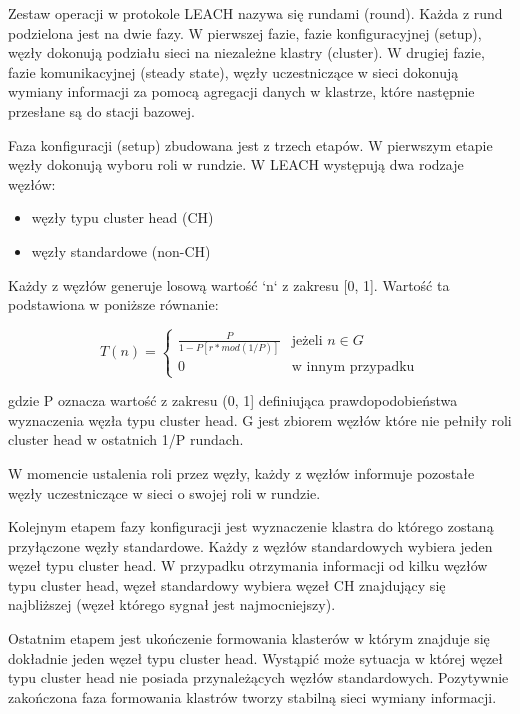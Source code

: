 \documentclass[a4paper,12pt,twoside,openany]{report}
\begin{document}
Zestaw operacji w protokole LEACH nazywa się rundami (round). Każda z rund podzielona jest na dwie fazy.
W pierwszej fazie, fazie konfiguracyjnej (setup), węzły dokonują podziału sieci na niezależne klastry (cluster).
W drugiej fazie, fazie komunikacyjnej (steady state), węzły uczestniczące w sieci dokonują wymiany informacji za pomocą agregacji danych w klastrze, które następnie
przesłane są do stacji bazowej.

Faza konfiguracji (setup) zbudowana jest z trzech etapów.
W pierwszym etapie węzły dokonują wyboru roli w rundzie. W LEACH występują dwa rodzaje węzłów:

\begin{itemize}
 \item węzły typu cluster head (CH)
 \item węzły standardowe (non-CH)
\end{itemize}

Każdy z węzłów generuje losową wartość `n` z zakresu [0, 1]. Wartość ta podstawiona w poniższe równanie:

\[
T(n) = \begin{cases}
\frac{P}{1 - P[r * mod(1/P)]} & \text{jeżeli } n \in G\\
0 & \text{w innym przypadku}
\end{cases}
\]

gdzie P oznacza wartość z zakresu (0, 1] definiująca prawdopodobieństwa wyznaczenia węzła typu cluster head.
G jest zbiorem węzłów które nie pełniły roli cluster head w ostatnich 1/P rundach.

W momencie ustalenia roli przez węzły, każdy z węzłów informuje pozostałe węzły uczestniczące w sieci o swojej roli w rundzie.

Kolejnym etapem fazy konfiguracji jest wyznaczenie klastra do którego zostaną przyłączone węzły standardowe.
Każdy z węzłów standardowych wybiera jeden węzeł typu cluster head. W przypadku otrzymania informacji od kilku węzłów typu cluster head,
węzeł standardowy wybiera węzeł CH znajdujący się najbliższej (węzeł którego sygnał jest najmocniejszy).

Ostatnim etapem jest ukończenie formowania klasterów w którym znajduje się dokładnie jeden węzeł typu cluster head.
Wystąpić może sytuacja w której węzeł typu cluster head nie posiada przynależących węzłów standardowych.
Pozytywnie zakończona faza formowania klastrów tworzy stabilną sieci wymiany informacji.
\end{document}
